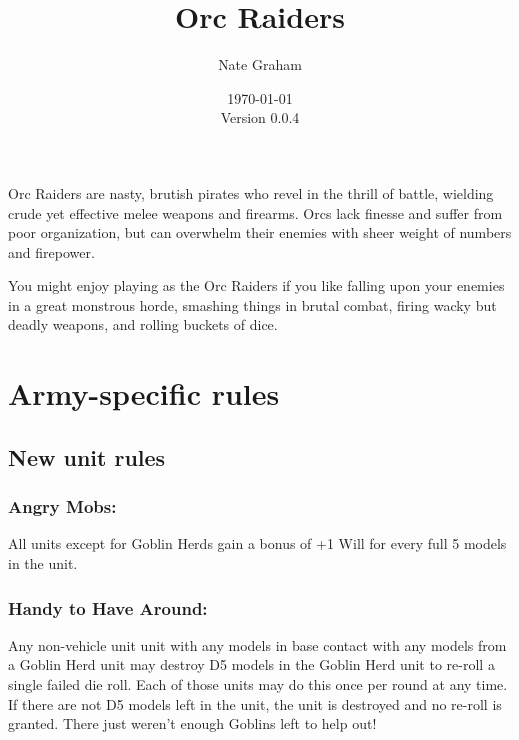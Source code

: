 








\title{Orc Raiders}
\author{Nate Graham}
\date{\today\\ Version 0.0.4}

\maketitle

Orc Raiders are nasty, brutish pirates who revel in the thrill of battle, wielding crude yet effective melee weapons and firearms. Orcs lack finesse and suffer from poor organization, but can overwhelm their enemies with sheer weight of numbers and firepower.

You might enjoy playing as the Orc Raiders if you like falling upon your enemies in a great monstrous horde, smashing things in brutal combat, firing wacky but deadly weapons, and rolling buckets of dice.



\section*{Army-specific rules}

\subsection*{New unit rules}

\subsubsection*{Angry Mobs:} All units except for Goblin Herds gain a bonus of +1 Will for every full 5 models in the unit.

\subsubsection*{Handy to Have Around:} Any non-vehicle unit unit with any models in base contact with any models from a Goblin Herd unit may destroy D5 models in the Goblin Herd unit to re-roll a single failed die roll. Each of those units may do this once per round at any time. If there are not D5 models left in the unit, the unit is destroyed and no re-roll is granted. There just weren't enough Goblins left to help out!


